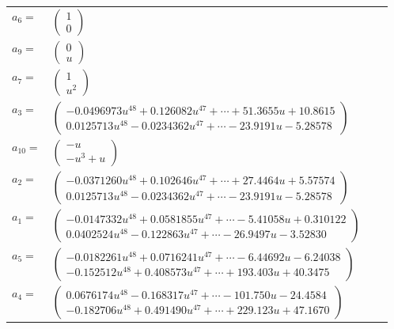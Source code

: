 \documentclass[1p]{elsarticle_modified}
\theoremstyle{definition}
\begin{document}
\begin{tabular}{m{7pt} m{180pt} m{7pt} m{180pt} }
\flushright $a_{6}=$&$\begin{pmatrix}1\\0\end{pmatrix}$ \\
\flushright $a_{9}=$&$\begin{pmatrix}0\\u\end{pmatrix}$ \\
\flushright $a_{7}=$&$\begin{pmatrix}1\\u^2\end{pmatrix}$ \\
\flushright $a_{3}=$&$\begin{pmatrix}-0.0496973 u^{48}+0.126082 u^{47}+\cdots+51.3655 u+10.8615\\0.0125713 u^{48}-0.0234362 u^{47}+\cdots-23.9191 u-5.28578\end{pmatrix}$ \\
\flushright $a_{10}=$&$\begin{pmatrix}- u\\- u^3+u\end{pmatrix}$ \\
\flushright $a_{2}=$&$\begin{pmatrix}-0.0371260 u^{48}+0.102646 u^{47}+\cdots+27.4464 u+5.57574\\0.0125713 u^{48}-0.0234362 u^{47}+\cdots-23.9191 u-5.28578\end{pmatrix}$ \\
\flushright $a_{1}=$&$\begin{pmatrix}-0.0147332 u^{48}+0.0581855 u^{47}+\cdots-5.41058 u+0.310122\\0.0402524 u^{48}-0.122863 u^{47}+\cdots-26.9497 u-3.52830\end{pmatrix}$ \\
\flushright $a_{5}=$&$\begin{pmatrix}-0.0182261 u^{48}+0.0716241 u^{47}+\cdots-6.44692 u-6.24038\\-0.152512 u^{48}+0.408573 u^{47}+\cdots+193.403 u+40.3475\end{pmatrix}$ \\
\flushright $a_{4}=$&$\begin{pmatrix}0.0676174 u^{48}-0.168317 u^{47}+\cdots-101.750 u-24.4584\\-0.182706 u^{48}+0.491490 u^{47}+\cdots+229.123 u+47.1670\end{pmatrix}$ \\

\end{tabular}
\end{document}
